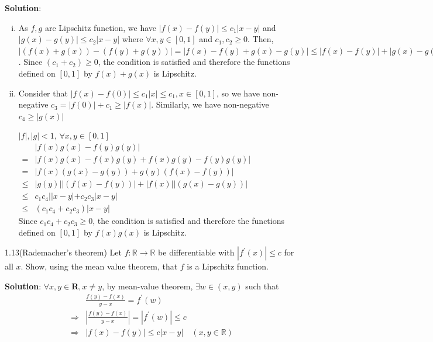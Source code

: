 \textbf{Solution}:  
\begin{enumerate}[(i)]
    \item As $f, g$ are Lipschitz function, we have $|f(x)-f(y)| \leq c_1|x-y|$ and $|g(x)-g(y)| \leq c_2|x-y|$  where $\forall x, y \in [0, 1]$ and $c_1, c_2 \geq 0$.
    Then, $|(f(x)+g(x)) - (f(y) + g(y))| = |f(x) - f(y) +g(x) - g(y)| \leq  |f(x) - f(y)| + |g(x) - g(y)|\leq (c_1 + c_2 )\cdot |x - y|, \forall x, y\in[0, 1] $. Since $(c_1+c_2)\geq 0$, the condition is satisfied and therefore
    the functions defined on $[0,1]$ by $f(x)+g(x)$ is Lipschitz. 
    \item Consider that $|f(x) -f(0)| \leq c_1 |x| \leq c_1, x\in[0, 1]$, so we have non-negative $c_3 = |f(0)| + c_1 \geq |f(x)|$. Similarly, 
    we have non-negative $c_4 \geq |g(x)|$
    
    $|f|, |g| < 1$, $\forall x, y\in[0, 1]$\\
    $\begin{aligned}
        &|f(x)g(x) - f(y)g(y)| \\
        =& |f(x)g(x) -f(x)g(y) + f(x)g(y)- f(y)g(y)| \\
        =& |f(x)(g(x) - g(y)) + g(y)(f(x) - f(y))| \\ 
        \leq& |g(y)||(f(x) - f(y))| + |f(x)||(g(x) - g(y))| \\
        \leq& c_1 c_4 ||x-y| + c_2 c_3|x-y| \\
        \leq& (c_1c_4 +c_2c_3) |x-y|
    \end{aligned}$\\
    Since $c_1c_4 +c_2c_3 \geq 0$, the condition is satisfied and therefore
    the functions defined on $[0,1]$ by $f(x)g(x)$ is Lipschitz.
\end{enumerate}


\begin{customexercise}{1.13(Rademacher's theorem)}\label{1.13}
    Let $f: \mathbb{R} \rightarrow \mathbb{R}$ be differentiable 
    with $\left|f^{\prime}(x)\right| \leq c$ for all $x$. 
    Show, using the mean value theorem, that $f$ is a Lipschitz function.
\end{customexercise}

\textbf{Solution}: 
$\forall x, y \in \mathbf{R} , x \neq y$, by mean-value theorem, $\exists w \in(x, y)$ such that 
$$
\begin{aligned}
    &\frac{f(y)-f(x)}{y-x}=f^{\prime}(w) \\
    \Rightarrow  &\left|\frac{f(y)-f(x)}{y-x}\right|=\left|f^{\prime}(w)\right| \leq c \\
    \Rightarrow &|f(x)-f(y)| \leq c|x-y| \quad (x, y \in \mathbb{R})
\end{aligned}
$$

